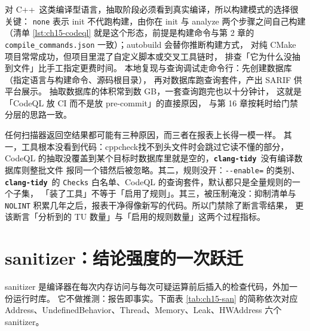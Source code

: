 \documentclass[12pt,a4paper,fontset=fandol]{ctexbook}
\newcommand{\Opt}[1]{\texttt{-\/-#1}}
\newcommand{\Bk}{\discretionary{}{}{}}
\newcommand{\Lib}[1]{\textbf{\texttt{#1}}}
\newcommand{\Lang}[1]{\textsf{#1}}
\newcommand{\CPP}{\Lang{C++}}
\newcommand{\Tidy}{\Lib{clang-tidy}}
\begin{document}
对 \CPP\ 这类编译型语言，抽取阶段必须看到真实编译，所以构建模式的选择很关键：
\texttt{none} 表示 init 不代跑构建，由你在 init 与 analyze 两个步骤之间自己构建
（清单 \ref{lst:ch15-codeql} 就是这个形态，前提是构建命令与第 2 章的
\texttt{compile\_commands.json} 一致）；autobuild 会替你推断构建方式，
对纯 CMake 项目常常成功，但项目里混了自定义脚本或交叉工具链时，
排查「它为什么没抽到文件」比手工指定更费时间。
本地复现与查询调试走命令行：先创建数据库（指定语言与构建命令、源码根目录），
再对数据库跑查询套件，产出 SARIF 供平台展示。
抽取数据库的体积常到数 GB，一套查询跑完也以十分钟计，
这就是「CodeQL 放 CI 而不是放 pre-commit」的直接原因，
与第 16 章按耗时给门禁分层的思路一致。

\begin{warning}[title={「0 findings」几乎从不等于安全}]
任何扫描器返回空结果都可能有三种原因，而三者在报表上长得一模一样。
其一，工具根本没看到代码：\Bk cppcheck\Bk 找不到头文件时会跳过它读不懂的部分，
CodeQL 的抽取没覆盖到某个目标时数据库里就是空的，\Tidy\ 没有编译数据库则整批文件
报同一个错然后被忽略。其二，规则没开：\Opt{enable=} 的类别、\Tidy\ 的
\texttt{Checks} 白名单、CodeQL 的查询套件，默认都只是全量规则的一个子集，
「装了工具」不等于「启用了规则」。其三，被压制淹没：抑制清单与 \texttt{NOLINT}
积累几年之后，报表干净得像新写的代码。所以门禁除了断言零结果，
更该断言「分析到的 TU 数量」与「启用的规则数量」这两个过程指标。
\end{warning}

\section{sanitizer：结论强度的一次跃迁}\label{sec:ch15-s5}

sanitizer 是编译器在每次内存访问与每次可疑运算前后插入的检查代码，外加一份运行时库。
它不做推测：报告即事实。下面表 \ref{tab:ch15-san} 的简称依次对应
Address、UndefinedBehavior、Thread、Memory、Leak、HWAddress 六个 sanitizer。
\end{document}
